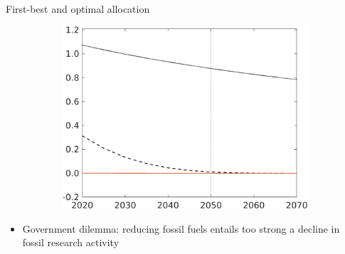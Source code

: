 \documentclass[11pt,aspectratio=169]{beamer}
\begin{document}
\begin{frame}{First-best and optimal allocation}
\begin{figure}[h!!]
\begin{subfigure}{0.45\textwidth}
			\includegraphics[width=1\textwidth]{../codding_model/own_basedOnFried/optimalPol_010922_revision/figures/all_13Sept22/NewCalib_effBauOpt_T_sffsg_Sun2_emnet1_spillover0_knspil3_xgr0_nsk0_sep0_extern0_PV1_etaa0.79_lgd0.png}
		\end{subfigure}
	\end{figure}
	\vspace{1mm}
	\begin{block}{}
		\begin{itemize}
			\item {Government dilemma: reducing fossil fuels entails too strong a decline in fossil research activity}
		\end{itemize}
	\end{block}	
\end{frame}
\end{document}

